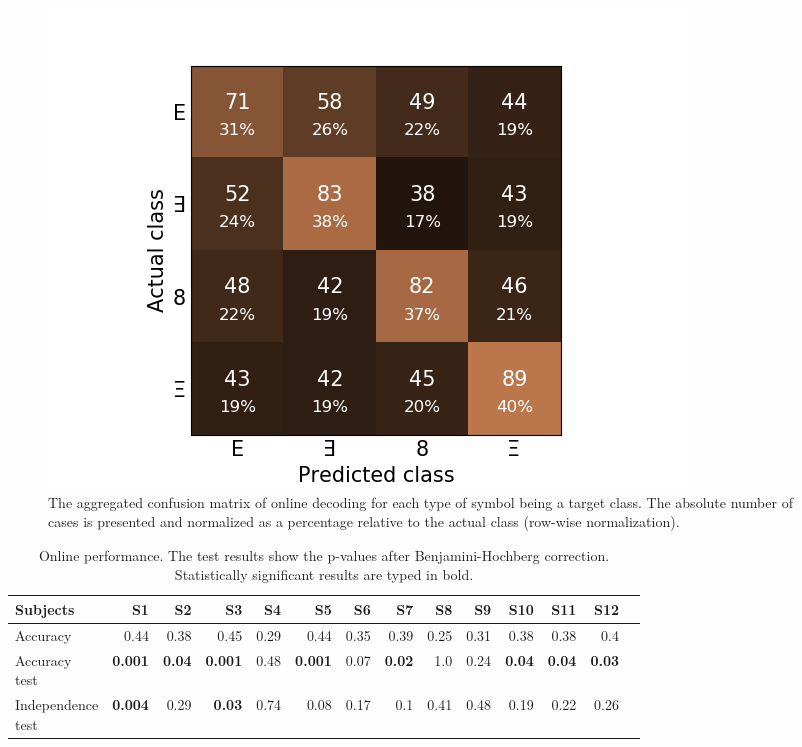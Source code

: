 \documentclass[12pt]{iopart}
\begin{document}
\begin{figure}[!t]
    \includegraphics[trim={1cm 0cm 1cm 1cm},clip,width=0.7\columnwidth]{../images/OnlineConfusion_percent.png}
    \caption{The aggregated confusion matrix of online decoding for each type of symbol being
    a target class. The absolute number of cases is presented and normalized as a percentage 
    relative to the actual class (row-wise normalization).}
\label{fig:onlineconf}
\end{figure}


\begin{table}
    \centering
    \caption{Online performance. The test results show the p-values after Benjamini-Hochberg correction.
    Statistically significant results are typed in bold.}
    \scriptsize
    \renewcommand{\arraystretch}{1.5}
    \begin{tabular}{l r r r r r r r r r r r r r}
        \hline
        Subjects & S1 & S2 & S3 & S4 & S5 & S6 & S7 & S8 & S9 & S10 & S11 & S12 \\
        \hline

        Accuracy & 0.44 & 0.38 & 0.45 & 0.29 & 0.44 & 0.35 & 0.39 & 0.25 & 0.31 & 0.38 & 0.38 & 0.4 \\ 
        \shortstack{Accuracy \\ test} & \textbf{0.001} & \textbf{0.04} & \textbf{0.001}
        & 0.48 & \textbf{0.001} & 0.07 & \textbf{0.02} & 1.0 & 0.24 & \textbf{0.04} & \textbf{0.04} & \textbf{0.03} \\
        \shortstack{Independence \\ test}  & \textbf{0.004} & 0.29 & \textbf{0.03} & 0.74
        & 0.08 & 0.17 & 0.1 & 0.41 & 0.48 & 0.19 & 0.22 & 0.26 \\
        \hline
    \end{tabular}
    \label{tab:onlineperf}
\end{table}
\end{document}
